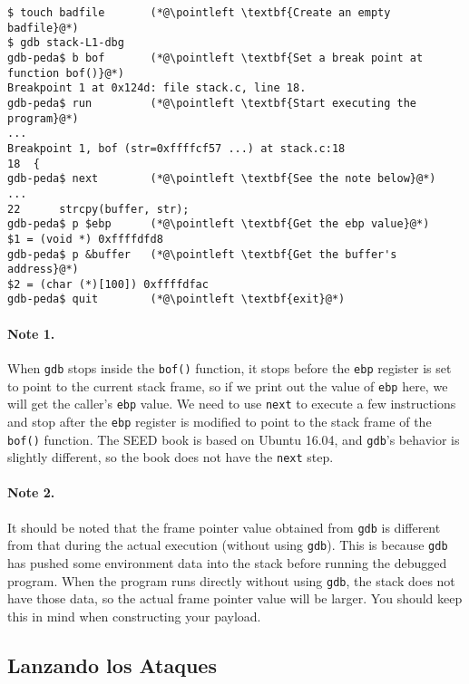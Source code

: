 \newcommand{\pointleft}{\reflectbox{\ding{221}}\xspace}

\begin{lstlisting}
$ touch badfile       (*@\pointleft \textbf{Create an empty badfile}@*)
$ gdb stack-L1-dbg
gdb-peda$ b bof       (*@\pointleft \textbf{Set a break point at function bof()}@*)
Breakpoint 1 at 0x124d: file stack.c, line 18.
gdb-peda$ run         (*@\pointleft \textbf{Start executing the program}@*)
...
Breakpoint 1, bof (str=0xffffcf57 ...) at stack.c:18
18  {
gdb-peda$ next        (*@\pointleft \textbf{See the note below}@*)
...
22	    strcpy(buffer, str);
gdb-peda$ p $ebp      (*@\pointleft \textbf{Get the ebp value}@*)
$1 = (void *) 0xffffdfd8   
gdb-peda$ p &buffer   (*@\pointleft \textbf{Get the buffer's address}@*)
$2 = (char (*)[100]) 0xffffdfac
gdb-peda$ quit        (*@\pointleft \textbf{exit}@*)
\end{lstlisting}

\paragraph{Note 1.} When \texttt{gdb} stops inside the \texttt{bof()} function, it 
stops before the \texttt{ebp} register is set
to point to the current stack frame, so if we print out the value of 
\texttt{ebp} here, we will get the caller's \texttt{ebp} value. We need to use 
\texttt{next} to execute a few instructions and stop 
after the \texttt{ebp} register is modified to point to the stack
frame of the \texttt{bof()} function. 
The SEED book is based on Ubuntu 16.04, and \texttt{gdb}'s behavior is slightly
different, so the book does not have the \texttt{next} step. 

\paragraph{Note 2.}
It should be noted that the frame pointer value
obtained from \texttt{gdb} is different from that during the actual
execution (without using \texttt{gdb}). This is because \texttt{gdb}  
has pushed some environment data into the stack before running the debugged program. 
When the program runs directly without using \texttt{gdb},
the stack does not have those data, so the actual frame pointer value 
will be larger. You should keep this in mind when constructing 
your payload. 


\subsection{Lanzando los Ataques} 

